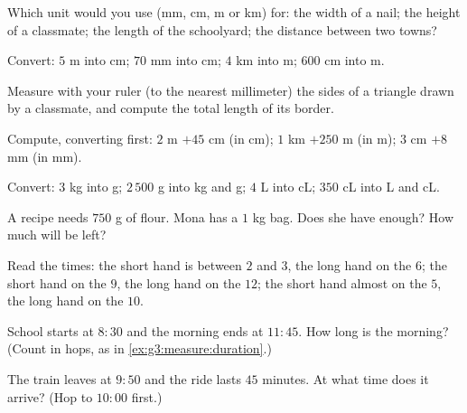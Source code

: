 \begin{exercise}[$\star$]\label{exo:g3:measure:1}
Which unit would you use (mm, cm, m or km) for: the width of a nail;
the height of a classmate; the length of the schoolyard; the
distance between two towns?
\end{exercise}

\begin{exercise}[$\star$]\label{exo:g3:measure:2}
Convert: $5$ m into cm; \quad $70$ mm into cm; \quad $4$ km into m;
\quad $600$ cm into m.
\end{exercise}

\begin{exercise}[$\star$]\label{exo:g3:measure:3}
Measure with your ruler (to the nearest millimeter) the sides of a
triangle drawn by a classmate, and compute the total length of its
border.
\end{exercise}

\begin{exercise}[$\star$]\label{exo:g3:measure:4}
Compute, converting first: $2$ m $+ 45$ cm (in cm); \quad
$1$ km $+ 250$ m (in m); \quad $3$ cm $+ 8$ mm (in mm).
\end{exercise}

\begin{exercise}[$\star$]\label{exo:g3:measure:5}
Convert: $3$ kg into g; \quad $2\,500$ g into kg and g; \quad
$4$ L into cL; \quad $350$ cL into L and cL.
\end{exercise}

\begin{exercise}[$\star$]\label{exo:g3:measure:6}
A recipe needs $750$ g of flour. Mona has a $1$ kg bag. Does she have
enough? How much will be left?
\end{exercise}

\begin{exercise}[$\star$]\label{exo:g3:measure:7}
Read the times: the short hand is between $2$ and $3$, the long hand
on the $6$; the short hand on the $9$, the long hand on the $12$;
the short hand almost on the $5$, the long hand on the $10$.
\end{exercise}

\begin{exercise}[$\star$]\label{exo:g3:measure:8}
School starts at $8{:}30$ and the morning ends at $11{:}45$. How long
is the morning? (Count in hops, as in
\cref{ex:g3:measure:duration}.)
\end{exercise}

\begin{exercise}[$\star$]\label{exo:g3:measure:9}
The train leaves at $9{:}50$ and the ride lasts $45$ minutes. At what
time does it arrive? (Hop to $10{:}00$ first.)
\end{exercise}

